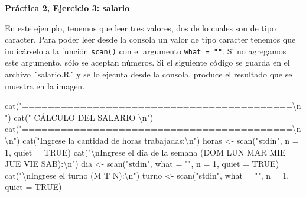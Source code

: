 \documentclass[
]{book}
\newenvironment{Shaded}{\begin{snugshade}}{\end{snugshade}}
\newcommand{\AttributeTok}[1]{\textcolor[rgb]{0.77,0.63,0.00}{#1}}
\newcommand{\ConstantTok}[1]{\textcolor[rgb]{0.00,0.00,0.00}{#1}}
\newcommand{\DecValTok}[1]{\textcolor[rgb]{0.00,0.00,0.81}{#1}}
\newcommand{\FunctionTok}[1]{\textcolor[rgb]{0.00,0.00,0.00}{#1}}
\newcommand{\NormalTok}[1]{#1}
\newcommand{\OtherTok}[1]{\textcolor[rgb]{0.56,0.35,0.01}{#1}}
\newcommand{\SpecialCharTok}[1]{\textcolor[rgb]{0.00,0.00,0.00}{#1}}
\newcommand{\StringTok}[1]{\textcolor[rgb]{0.31,0.60,0.02}{#1}}
\begin{document}
\textbf{Práctica 2, Ejercicio 3: salario}

En este ejemplo, tenemos que leer tres valores, dos de lo cuales son de tipo caracter. Para poder leer desde la consola un valor de tipo caracter tenemos que indicárselo a la función \texttt{scan()} con el argumento \texttt{what\ =\ ""}. Si no agregamos este argumento, sólo se aceptan números. Si el siguiente código se guarda en el archivo ´salario.R´ y se lo ejecuta desde la consola, produce el resultado que se muestra en la imagen.

\begin{Shaded}
\begin{Highlighting}[]
\FunctionTok{cat}\NormalTok{(}\StringTok{"==========================================}\SpecialCharTok{\textbackslash{}n}\StringTok{"}\NormalTok{)}
\FunctionTok{cat}\NormalTok{(}\StringTok{"           CÁLCULO DEL SALARIO            }\SpecialCharTok{\textbackslash{}n}\StringTok{"}\NormalTok{)}
\FunctionTok{cat}\NormalTok{(}\StringTok{"==========================================}\SpecialCharTok{\textbackslash{}n\textbackslash{}n}\StringTok{"}\NormalTok{)}
\FunctionTok{cat}\NormalTok{(}\StringTok{"Ingrese la cantidad de horas trabajadas:}\SpecialCharTok{\textbackslash{}n}\StringTok{"}\NormalTok{)}
\NormalTok{horas }\OtherTok{\textless{}{-}} \FunctionTok{scan}\NormalTok{(}\StringTok{"stdin"}\NormalTok{, }\AttributeTok{n =} \DecValTok{1}\NormalTok{, }\AttributeTok{quiet =} \ConstantTok{TRUE}\NormalTok{)}
\FunctionTok{cat}\NormalTok{(}\StringTok{"}\SpecialCharTok{\textbackslash{}n}\StringTok{Ingrese el día de la semana (DOM LUN MAR MIE JUE VIE SAB):}\SpecialCharTok{\textbackslash{}n}\StringTok{"}\NormalTok{)}
\NormalTok{dia }\OtherTok{\textless{}{-}} \FunctionTok{scan}\NormalTok{(}\StringTok{"stdin"}\NormalTok{, }\AttributeTok{what =} \StringTok{""}\NormalTok{, }\AttributeTok{n =} \DecValTok{1}\NormalTok{, }\AttributeTok{quiet =} \ConstantTok{TRUE}\NormalTok{)}
\FunctionTok{cat}\NormalTok{(}\StringTok{"}\SpecialCharTok{\textbackslash{}n}\StringTok{Ingrese el turno (M T N):}\SpecialCharTok{\textbackslash{}n}\StringTok{"}\NormalTok{)}
\NormalTok{turno }\OtherTok{\textless{}{-}} \FunctionTok{scan}\NormalTok{(}\StringTok{"stdin"}\NormalTok{, }\AttributeTok{what =} \StringTok{""}\NormalTok{, }\AttributeTok{n =} \DecValTok{1}\NormalTok{, }\AttributeTok{quiet =} \ConstantTok{TRUE}\NormalTok{)}


\end{Highlighting}
\end{Shaded}
\end{document}
